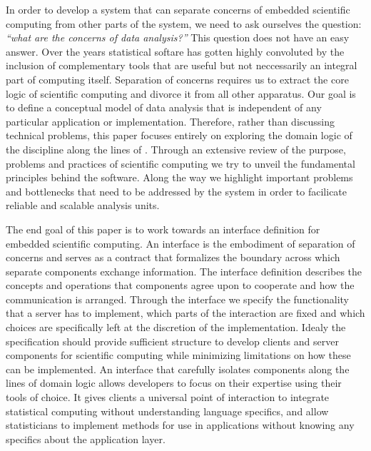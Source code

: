 In order to develop a system that can separate concerns of embedded scientific computing from other parts of the system, we need to ask ourselves the question: \emph{``what are the concerns of data analysis?''} This question does not have an easy answer. Over the years statistical softare has gotten highly convoluted by the inclusion of complementary tools that are useful but not neccessarily an integral part of computing itself. Separation of concerns requires us to extract the core logic of scientific computing and divorce it from all other apparatus. Our goal is to define a conceptual model of data analysis that is independent of any particular application or implementation. Therefore, rather than discussing technical problems, this paper focuses entirely on exploring the domain logic of the discipline along the lines of \cite{evans2004domain}. Through an extensive review of the purpose, problems and practices of scientific computing we try to unveil the fundamental principles behind the software. Along the way we highlight important problems and bottlenecks that need to be addressed by the system in order to facilicate reliable and scalable analysis units.

The end goal of this paper is to work towards an interface definition for embedded scientific computing. An interface is the embodiment of separation of concerns and serves as a contract that formalizes the boundary across which separate components exchange information. The interface definition describes the concepts and operations that components agree upon to cooperate and how the communication is arranged. Through the interface we specify the functionality that a server has to implement, which parts of the interaction are fixed and which choices are specifically left at the discretion of the implementation. Idealy the specification should provide sufficient structure to develop clients and server components for scientific computing while minimizing limitations on how these can be implemented. An interface that carefully isolates components along the lines of domain logic allows developers to focus on their expertise using their tools of choice. It gives clients a universal point of interaction to integrate statistical computing without understanding language specifics, and allow statisticians to implement methods for use in applications without knowing any specifics about the application layer.








